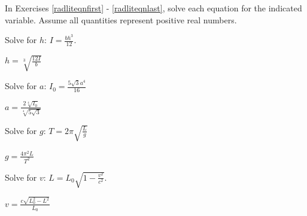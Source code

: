 \documentclass{ximera}
\begin{document}
\begin{question}

In Exercises \ref{radliteqnfirst} - \ref{radliteqnlast}, solve each equation for the indicated variable.  Assume all quantities represent positive real numbers.

\begin{problem} \label{radliteqnfirst}
Solve for $h$:  $I = \frac{bh^3}{12}$. 

\begin{solution}
$h = \sqrt[3]{\frac{12I}{b}}$ 
\end{solution}
\end{problem}

\begin{problem}
Solve for $a$:  $I_{0} = \frac{5\sqrt{3} a^4}{16}$

\begin{solution}
$a = \frac{2 \sqrt[4]{I_{0}}}{\sqrt[4]{5\sqrt{3}}}$
\end{solution}
\end{problem}

\begin{problem}
Solve for $g$:  $T = 2\pi \sqrt{\frac{L}{g}}$

\begin{solution}
$g = \frac{4 \pi^2 L}{T^2}$ 
\end{solution}
\end{problem}

\begin{problem} \label{radliteqnlast}
Solve for $v$:   $L = L_{0} \sqrt{1 - \frac{v^2}{c^2}}$.
\end{problem}

\begin{solution}
 $v = \frac{c \sqrt{L_{0}^2 - L^2}}{L_{0}}$
\end{solution}

\end{question}
\end{document}
